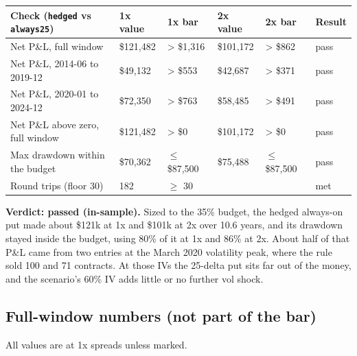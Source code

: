 \documentclass{article}
\begin{document}
\begin{center}\small
\begin{tabularx}{\linewidth}{>{\raggedright\arraybackslash}X l l l l l}
\toprule
\textbf{Check (\texttt{hedged} vs \texttt{always25})} & \textbf{1x value} & \textbf{1x bar} & \textbf{2x value} & \textbf{2x bar} & \textbf{Result} \\
\midrule
Net P\&L, full window & \$121,482 & > \$1,316 & \$101,172 & > \$862 & pass \\
Net P\&L, 2014-06 to 2019-12 & \$49,132 & > \$553 & \$42,687 & > \$371 & pass \\
Net P\&L, 2020-01 to 2024-12 & \$72,350 & > \$763 & \$58,485 & > \$491 & pass \\
Net P\&L above zero, full window & \$121,482 & > \$0 & \$101,172 & > \$0 & pass \\
Max drawdown within the budget & \$70,362 & \ensuremath{\leq} \$87,500 & \$75,488 & \ensuremath{\leq} \$87,500 & pass \\
Round trips (floor 30) & 182 & \ensuremath{\geq} 30 &  &  & met \\
\bottomrule
\end{tabularx}
\end{center}

\textbf{Verdict: passed (in-sample).} Sized to the 35\% budget, the hedged always-on put made about \$121k at 1x and \$101k at 2x over 10.6 years, and its drawdown stayed inside the budget, using 80\% of it at 1x and 86\% at 2x. About half of that P\&L came from two entries at the March 2020 volatility peak, where the rule sold 100 and 71 contracts. At those IVs the 25-delta put sits far out of the money, and the scenario's 60\% IV adds little or no further vol shock.

\subsection{Full-window numbers (not part of the bar)}

All values are at 1x spreads unless marked.
\end{document}
